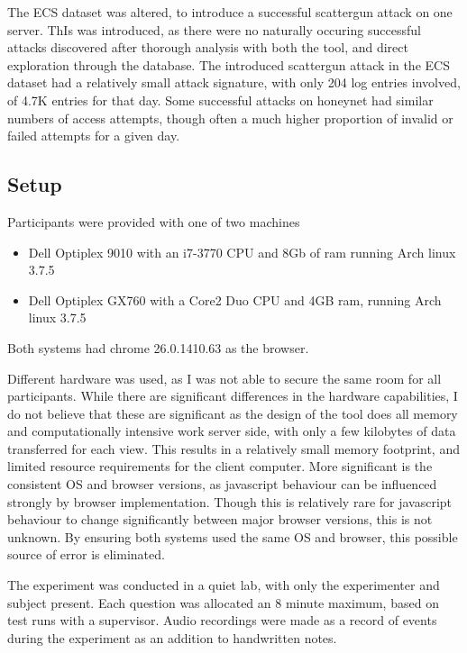 The ECS dataset was altered, to introduce a successful scattergun attack on one server. ThIs was introduced, as there were no naturally occuring successful attacks discovered after thorough analysis with both the tool, and direct exploration through the database.  
The introduced scattergun attack in the ECS dataset had a relatively small attack signature, with only 204 log entries involved, of 4.7K entries for that day. Some successful attacks on honeynet had similar numbers of access attempts, though often a much higher proportion of invalid or failed attempts for a given day. 

\subsection{Setup}
Participants were provided with one of two machines
\begin{itemize}
\item{Dell Optiplex 9010 with an i7-3770 CPU and 8Gb of ram running Arch linux 3.7.5}
\item{Dell Optiplex GX760 with a Core2 Duo CPU and 4GB ram, running Arch linux 3.7.5}
\end{itemize}
Both systems had chrome 26.0.1410.63 as the browser.

Different hardware was used, as I was not able to secure the same room for all participants. 
While there are significant differences in the hardware capabilities, I do not believe that these are significant
as the design of the tool does all memory and computationally intensive work server side, with only a few kilobytes of data transferred for each view. This results in a relatively small memory footprint, and limited resource requirements for the client computer.
More significant is the consistent OS and browser versions, as javascript behaviour can be influenced strongly by browser implementation. Though this is relatively rare for javascript behaviour to change significantly between major browser versions, this is not unknown. By ensuring both systems used the same OS and browser, this possible source of error is eliminated.

The experiment was conducted in a quiet lab, with only the experimenter and subject present. Each question was allocated an 8 minute maximum, based on test runs with a supervisor. Audio recordings were made as a record of events during the experiment as an addition to handwritten notes. 


